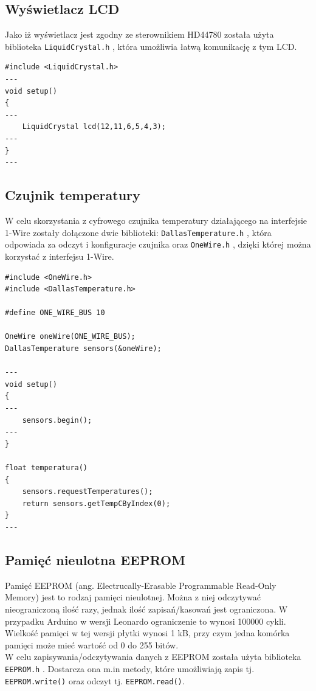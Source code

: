\subsection{Wyświetlacz LCD}

Jako iż wyświetlacz jest zgodny ze sterownikiem HD44780 została użyta biblioteka \texttt{LiquidCrystal.h} \cite{lib_lcd}, która umożliwia łatwą komunikację z tym LCD.

\begin{lstlisting}[label=list:lcd_setup,caption=Inicjalizacja wyświetlacza,
basicstyle=\footnotesize\ttfamily]
#include <LiquidCrystal.h>
---
void setup()
{
---
    LiquidCrystal lcd(12,11,6,5,4,3);
---
}
---
\end{lstlisting}

\subsection{Czujnik temperatury}

W celu skorzystania z cyfrowego czujnika temperatury działającego na interfejsie 1-Wire zostały dołączone dwie biblioteki: \texttt{DallasTemperature.h} \cite{lib_dallas}, która odpowiada za odczyt i konfiguracje czujnika oraz \texttt{OneWire.h} \cite{lib_onewire}, dzięki której można korzystać z interfejsu 1-Wire.

\begin{lstlisting}[label=list:d18s20_setup,caption=Inicjalizacja czujnika i odczyt temperatury,
basicstyle=\footnotesize\ttfamily]
#include <OneWire.h>
#include <DallasTemperature.h>

#define ONE_WIRE_BUS 10

OneWire oneWire(ONE_WIRE_BUS);
DallasTemperature sensors(&oneWire);

---
void setup()
{
---
    sensors.begin();
---
}

float temperatura() 
{
    sensors.requestTemperatures();
    return sensors.getTempCByIndex(0);
}
---
\end{lstlisting}


\subsection{Pamięć nieulotna EEPROM}
Pamięć EEPROM (ang. Electrucally-Erasable Programmable Read-Only Memory) jest to rodzaj pamięci nieulotnej. Można z niej odczytywać nieograniczoną ilość razy, jednak ilość zapisań/kasowań jest ograniczona. W przypadku Arduino w wersji Leonardo ograniczenie to wynosi 100000 cykli. Wielkość pamięci w tej wersji płytki wynosi 1 kB, przy czym jedna komórka pamięci może mieć wartość od 0 do 255 bitów.\\
W celu zapisywania/odczytywania danych z EEPROM została użyta biblioteka \texttt{EEPROM.h} \cite{lib_eeprom}. Dostarcza ona m.in metody, które umożliwiają zapis tj. \texttt{EEPROM.write()} oraz odczyt tj. \texttt{EEPROM.read()}.
